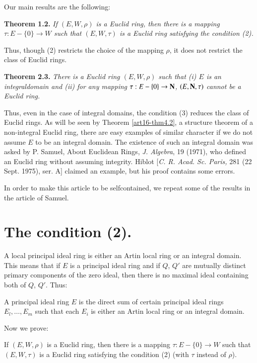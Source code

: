 Our main results are the following:

\vskip 0.3cm

\noindent
{\bf Theorem 1.2.}
{\em If $(E, W, \rho)$ is a Euclid ring, then there is a mapping $\tau: E - \{0\} \to W$ such that $(E, W, \tau)$ is a Euclid ring satisfying the condition (2).}


Thus, though (2) restricts the choice of the mapping $\rho$, it does not restrict the class of Euclid rings.

\vskip 0.3cm

\noindent
{\bf Theorem 2.3.}
{\em There is a Euclid ring $(E, W, \rho)$ such that (i) $E$ is an integral\pageoriginale domain and (ii) for any mapping $\tau: E - \{0\} \to \mathbf{N}$, $(E, \mathbf{N}, \tau)$ cannot be a Euclid ring.}
     

Thus, even in the case of integral domains, the condition (3) reduces the class of Euclid rings. As will be seen by Theorem \ref{art16-thm4.2}, a structure theorem of a non-integral Euclid ring, there are easy examples of similar character if we do not assume $E$ to be an integral domain. The existence of such an integral domain was asked by P. Samuel, About Euclidean Rings, {\em J. Algebra}, 19 (1971), who defined an Euclid ring without assuming integrity. Hiblot [{\em C. R. Acad. Sc. Paris,} 281 (22 Sept. 1975), ser. A] claimed an example, but his proof contains some errors.

In order to make this article to be selfcontained, we repeat some of the results in the article of Samuel.

\section{The condition (2).}\label{art16-sec1}
 A local principal ideal ring is either an Artin local ring or an integral domain. This means that if $E$ is a principal ideal ring and if $Q$, $Q'$ are mutually distinct primary components of the zero ideal, then there is no maximal ideal containing both of $Q$, $Q'$. Thus:

\begin{lemma}\label{art16-lem1.1}
A principal ideal ring $E$ is the direct sum of certain principal ideal rings $E_l,\ldots, E_m$ such that each $E_i$ is either an Artin local ring or an integral domain.
\end{lemma}

Now we prove:

\begin{thm}\label{art16-thm1.2}
If $(E, W, \rho)$ is a Euclid ring, then there is a mapping $\tau: E - \{0\} \to W$ such that $(E, W, \tau)$ is a Euclid ring satisfying the condition (2) (with $\tau$ instead of $\rho$).
\end{thm}


